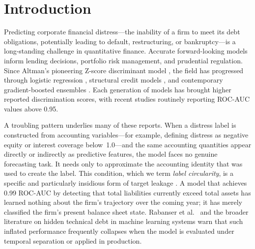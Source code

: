 \documentclass[sigconf,anonymous]{acmart}
\begin{document}


\maketitle

\section{Introduction}

Predicting corporate financial distress---the inability of a firm to meet its debt obligations, potentially leading to default, restructuring, or bankruptcy---is a long-standing challenge in quantitative finance. Accurate forward-looking models inform lending decisions, portfolio risk management, and prudential regulation. Since Altman's pioneering Z-score discriminant model \cite{altman1968}, the field has progressed through logistic regression \cite{ohlson1980}, structural credit models \cite{merton1974}, and contemporary gradient-boosted ensembles \cite{chen2016, ke2017}. Each generation of models has brought higher reported discrimination scores, with recent studies routinely reporting ROC-AUC values above 0.95.

A troubling pattern underlies many of these reports. When a distress label is constructed from accounting variables---for example, defining distress as negative equity or interest coverage below~1.0---and the same accounting quantities appear directly or indirectly as predictive features, the model faces no genuine forecasting task. It needs only to approximate the accounting identity that was used to create the label. This condition, which we term \textit{label circularity}, is a specific and particularly insidious form of target leakage \cite{sculley2015}. A model that achieves 0.99 ROC-AUC by detecting that total liabilities currently exceed total assets has learned nothing about the firm's trajectory over the coming year; it has merely classified the firm's present balance sheet state. Rabanser et al.\ \cite{rabanser2019} and the broader literature on hidden technical debt in machine learning systems \cite{sculley2015} warn that such inflated performance frequently collapses when the model is evaluated under temporal separation or applied in production.
\end{document}
